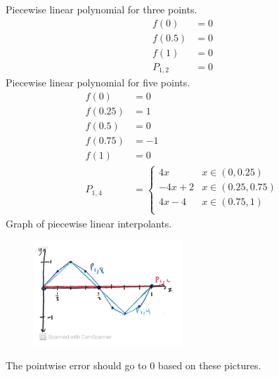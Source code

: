 \documentclass[newpage]{homework}
\begin{document}
\maketitle

\question
Piecewise linear polynomial for three points.
\begin{align*}
	f(0)	&=	0	\\
	f(0.5)	&=	0	\\
	f(1)	&=	0	\\
	P_{1,2}	&= 0
\end{align*}
Piecewise linear polynomial for five points.
\begin{align*}
	f(0)	&=	0	\\
	f(0.25)	&=	1	\\
	f(0.5)	&=	0	\\
	f(0.75)	&=	-1	\\
	f(1)	&=	0	\\
	P_{1,4}	&= \begin{cases}
		4x	&	x \in (0,0.25)	\\
		-4x+2	&	x \in (0.25,0.75)	\\
		4x-4	&	x \in (0.75,1)	\\
	\end{cases}
\end{align*}
Graph of piecewise linear interpolants.
\begin{figure}[htbp]
	\centering
	\includegraphics[width=0.5\textwidth]{1c.jpg}
\end{figure}
The pointwise error should go to 0 based on these pictures.
\end{document}
